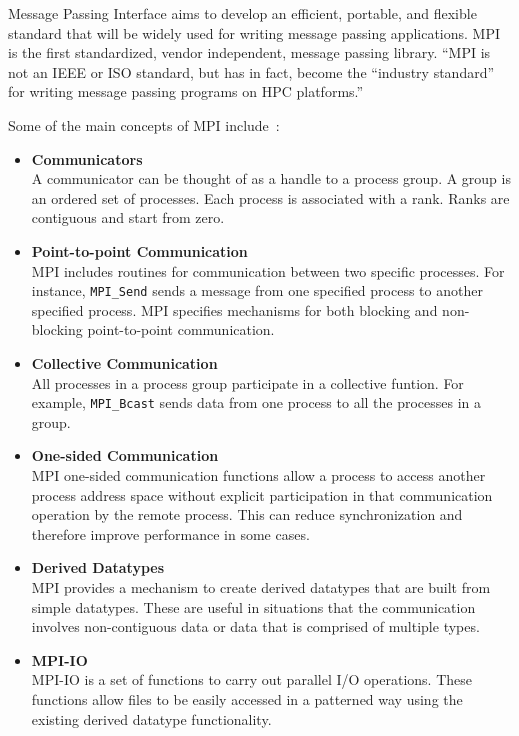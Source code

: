 Message Passing Interface aims to develop an efficient, portable, and flexible standard that will be widely used for writing message passing applications. MPI is the first standardized, vendor independent, message passing library. ``MPI is not an IEEE or ISO standard, but has in fact, become the ``industry standard'' for writing message passing programs on HPC platforms.''~\cite{barker2015message}

Some of the main concepts of MPI include~\cite{snir1998mpi,geist1996mpi,walker1996mpi,gropp1999using}:
\begin{itemize}
\item \textbf{Communicators}\\
  A communicator can be thought of as a handle to a process group. A group is an ordered set of processes. Each process is associated with a rank. Ranks are contiguous and start from zero.
  
\item \textbf{Point-to-point Communication}\\
  MPI includes routines for communication between two specific processes. For instance, \verb|MPI_Send| sends a message from one specified process to another specified process. MPI specifies mechanisms for both blocking and non-blocking point-to-point communication. 

\item \textbf{Collective Communication}\\
  All processes in a process group participate in a collective funtion. For example, \verb|MPI_Bcast| sends data from one process to all the processes in a group.
  
\item \textbf{One-sided Communication}\\
  MPI one-sided communication functions allow a process to access another process address space without explicit participation in that communication operation by the remote process. This can reduce synchronization and therefore improve performance in some cases.
  
\item \textbf{Derived Datatypes}\\
  MPI provides a mechanism to create derived datatypes that are built from simple datatypes. These are useful in situations that the communication involves non-contiguous data or data that is comprised of multiple types.

\item \textbf{MPI-IO}\\
  MPI-IO is a set of functions to carry out parallel I/O operations. These functions allow files to be easily accessed in a patterned way using the existing derived datatype functionality.
  
\end{itemize}


